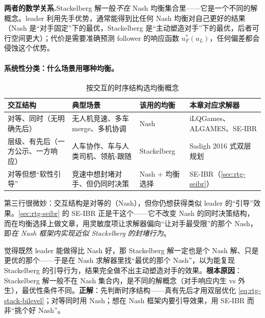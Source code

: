 \begin{note}
\textbf{两者的数学关系.}\;Stackelberg 解一般\emph{不在} Nash 均衡集合里——它是一个不同的解概念。leader 利用先手优势，通常能得到比任何 Nash 均衡对自己更好的结果（Nash 是“对手固定”下的最优，Stackelberg 是“主动塑造对手”下的最优，后者可行空间更大）；代价是需要准确预测 follower 的响应函数 $u_F^*(u_L)$，任何偏差都会侵蚀这个优势。
\end{note}

\paragraph{系统性分类：什么场景用哪种均衡。}
\begin{table}[H]\centering\small
\caption{按交互的时序结构选均衡概念}
\label{tab:rtg-concept-pick}
\begin{tabular}{p{} p{} p{} p{}}
\toprule
交互结构 & 典型场景 & 该用的均衡 & 本章对应求解器 \\
\midrule
对等、同时（无明确先后） & 无人机竞速、多车 merge、多机协调 & Nash & iLQGames、ALGAMES、SE-IBR \\
层级、有先后（一方公示、一方响应） & 人车协作、车与人类司机、领航-跟随 & Stackelberg & Sadigh 2016 式双层规划 \\
对等但想“软性引导” & 竞速中想封堵对手、但仍同时决策 & Nash + 均衡选择 & SE-IBR（\cref{sec:rtg-seibr}） \\
\bottomrule
\end{tabular}
\end{table}

\noindent 第三行很微妙：交互结构是对等的（Nash），但你仍想获得类似 leader 的“引导”效果。\cref{sec:rtg-seibr} 的 SE-IBR 正是干这个——它不改变 Nash 的同时决策结构，而在均衡选择上做文章，用灵敏度项让求解器偏向“让对手最受限”的那个 Nash，即\emph{在 Nash 框架内实现近似 Stackelberg 的封堵行为}。

\begin{pitfall}
觉得既然 leader 能做得比 Nash 好，那 Stackelberg 解一定也是个 Nash 解、只是更优的那个——于是在 Nash 求解器里找“最优的那个 Nash”，以为能复现 Stackelberg 的引导行为，结果完全做不出主动塑造对手的效果。\textbf{根本原因}：Stackelberg 解一般不在 Nash 集合内，是不同的解概念（对手响应内生 vs 外生），最优性条件不同。\textbf{正解}：先判断时序结构——真有先后才用双层优化 \cref{eq:rtg-stack-bilevel}；对等同时用 Nash；想在 Nash 框架内要引导效果，用 SE-IBR 而非“挑个好 Nash”。
\end{pitfall}

